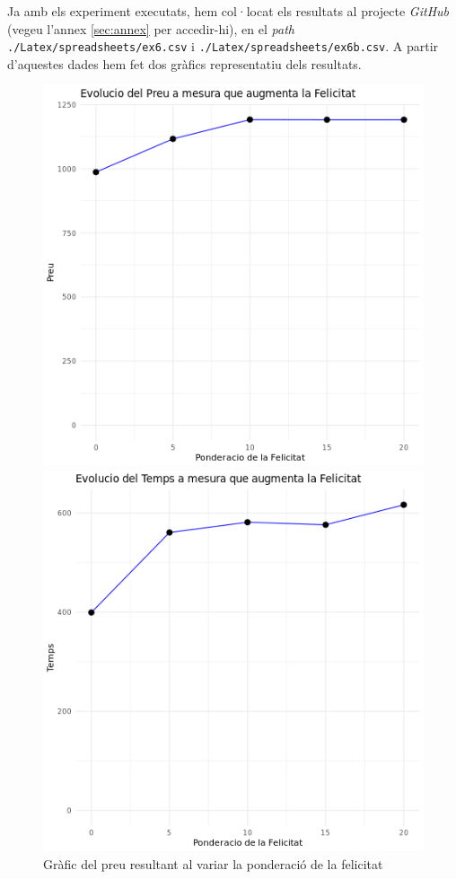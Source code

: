 \documentclass[a4paper]{article}
\begin{document}
	Ja amb els experiment executats, hem col·locat els resultats al projecte \textit{GitHub} (vegeu l'annex \ref{sec:annex} per accedir-hi), en el \textit{path} \texttt{./Latex/spreadsheets/ex6.csv} i \texttt{./Latex/spreadsheets/ex6b.csv}. A partir d'aquestes dades hem fet dos gràfics representatiu dels resultats.
	
	\begin{figure}[H]
		\centering
		\begin{minipage}{0.45\textwidth}
			\centering
			\includegraphics[width=\textwidth]{images/exp6_grafic.png}
			\caption{Gràfic del preu resultant al variar la ponderació de la felicitat}
			\label{fig:exp6a_grafic}
		\end{minipage} \hfill
		\begin{minipage}{0.45\textwidth}
			\centering
			\includegraphics[width=\textwidth]{images/exp6b_grafic.png}

\end{minipage}
\end{figure}
\end{document}
